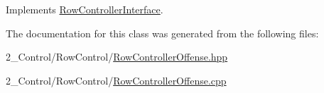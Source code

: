 Implements \hyperlink{class_row_controller_interface_a66c9b362e84b2207a18726d8248505eb}{Row\+Controller\+Interface}.



The documentation for this class was generated from the following files\+:\begin{DoxyCompactItemize}
\item 
2\+\_\+\+Control/\+Row\+Control/\hyperlink{_row_controller_offense_8hpp}{Row\+Controller\+Offense.\+hpp}\item 
2\+\_\+\+Control/\+Row\+Control/\hyperlink{_row_controller_offense_8cpp}{Row\+Controller\+Offense.\+cpp}\end{DoxyCompactItemize}
